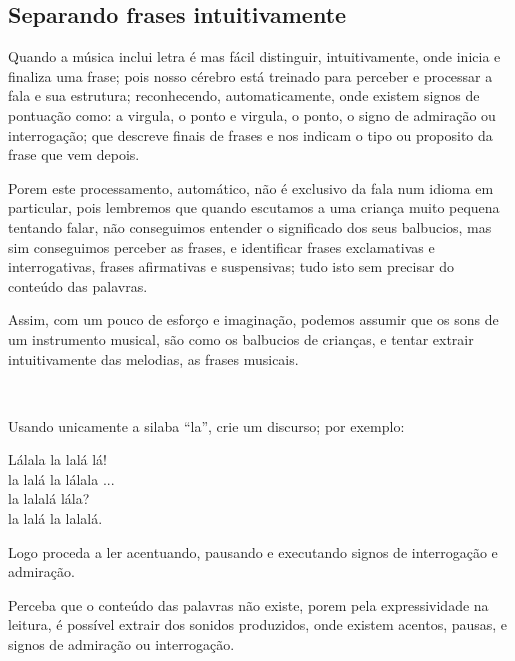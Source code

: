 \subsection{Separando frases intuitivamente}

Quando a música inclui letra é mas fácil distinguir, intuitivamente, 
onde inicia e finaliza uma frase;
pois nosso cérebro está treinado para perceber e processar a fala e sua estrutura;
reconhecendo, automaticamente,
onde existem signos de pontuação como:
a virgula, o ponto e virgula, o ponto, o signo de admiração ou interrogação;
que descreve finais de frases e nos indicam o tipo ou proposito da frase que vem depois.

Porem este processamento, automático, não é exclusivo da fala num idioma em particular,
pois lembremos que quando escutamos a uma criança muito pequena tentando falar,
não conseguimos entender o significado dos seus balbucios, 
mas sim conseguimos perceber as frases, 
e identificar frases exclamativas e interrogativas,
frases afirmativas e suspensivas;
tudo isto sem precisar do conteúdo das palavras.

Assim, com um pouco de esforço e imaginação,
podemos assumir que os sons de um instrumento musical, 
são como os balbucios de crianças, e tentar extrair intuitivamente das melodias,
as frases musicais. 
 
~

\begin{example}[O discurso de ``la'']
\label{ex:discrusodela}
Usando unicamente a silaba ``la'', crie um discurso; por exemplo:
\begin{citando}%
Lálala la lalá lá!\\
la lalá la lálala ...\\
la lalalá lála?\\
la lalá la lalalá.\\
\end{citando}%
Logo proceda a ler acentuando, pausando e
executando signos de interrogação e admiração.

Perceba que o conteúdo das palavras não existe, 
porem pela expressividade na leitura,
é possível extrair dos sonidos produzidos,
onde existem acentos, pausas, e signos de admiração ou interrogação.
\end{example}

